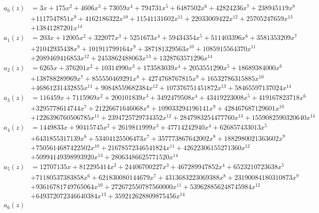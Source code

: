 \documentclass[reqno]{amsart}
\theoremstyle{definition}
\theoremstyle{remark}
\numberwithin{equation}{section}
\begin{document}
\begin{align*}
a_0(z)
&= 3 x + 175 x^2 + 4606 x^3 + 73059 x^4 + 794731 x^5 + 6487502 x^6 + 42824236 x^7 + 238945119 x^8\\
&+ 1117547851 x^9 + 4162186322 x^{10} + 11541131602 x^{11} + 22033069422 x^{12} + 25705247659 x^{13}\\
&+ 13841287201 x^{14}\\
a_1(z) 
&= 203 x + 12005 x^2 + 322077 x^3 + 5251673 x^4 + 59434354 x^5 + 511403396 x^6 + 3581353209 x^7\\
&+ 21042935438 x^8 + 101911799164 x^9 + 387181329563 x^{10} + 1085915564370 x^{11}\\
&+ 2089469416853 x^{12} + 2453862488063 x^{13} + 1328763571296 x^{14}\\
a_2(z) 
&= 6265 x + 376201 x^2 + 10314990 x^3 + 173583039 x^4 + 2053551290 x^5 + 18689384000 x^6\\
&+ 138788289969 x^7 + 855550469291 x^8 + 4274768767815 x^9 + 16532786315885 x^{10}\\
&+ 46861231432855 x^{11} + 90848559682384 x^{12} + 107376751451872 x^{13} + 58465597137024 x^{14}\\
a_3(z)
&= 116459 x + 7115969 x^2 + 200101839 x^3 + 3492479508 x^4 + 43419223008 x^5 + 419167823718 x^6\\
&+ 3295778614744 x^7 + 21226671646068 x^8 + 109033294196141 x^9 + 428467687129601 x^{10}\\
&+ 1226396760506785 x^{11} + 2394725729734352 x^{12} + 2847983254477760 x^{13} + 1559082590320640 x^{14}\\
a_4(z)
&= 1449833 x + 90415745 x^2 + 2619811999 x^3 + 47714242940 x^4 + 626857433013 x^5\\ 
&+ 6431855317139 x^6 + 53404125506473 x^7 + 357773867642002 x^8 + 1882980021363602 x^9\\ 
&+ 7505614687422502 x^{10} + 21678572346541824 x^{11} + 42622306155271360 x^{12}\\ 
&+ 50994149398993920 x^{13} + 28063486625771520 x^{14}\\
a_5(z) 
&= 12707135 x + 812295414 x^2 + 24406700227 x^3 + 467289947852 x^4 + 6523210723638 x^5\\ 
&+ 71180537383858 x^6 + 621830080144679 x^7 + 4313683223069388 x^8 + 23190084180310873 x^9\\ 
&+ 93616781749765064 x^{10} + 272672550787560000 x^{11} + 539628856248745984 x^{12}\\
&+ 649372072346640384 x^{13} + 359212628809875456 x^{14}\\
a_6(z) 

\end{align*}
\end{document}
